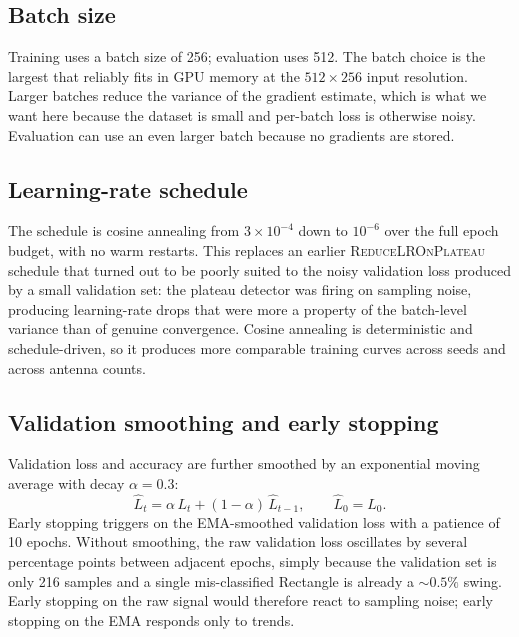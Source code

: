 \documentclass[letterpaper,11pt,leqno]{article}
\begin{document}
\subsection{Batch size}

Training uses a batch size of 256; evaluation uses 512. The batch choice is the largest that reliably fits in GPU memory at the $512\times 256$ input resolution. Larger batches reduce the variance of the gradient estimate, which is what we want here because the dataset is small and per-batch loss is otherwise noisy. Evaluation can use an even larger batch because no gradients are stored.

\subsection{Learning-rate schedule}

The schedule is cosine annealing \citep{Loshchilov17} from $3\times 10^{-4}$ down to $10^{-6}$ over the full epoch budget, with no warm restarts. This replaces an earlier \textsc{ReduceLROnPlateau} schedule that turned out to be poorly suited to the noisy validation loss produced by a small validation set: the plateau detector was firing on sampling noise, producing learning-rate drops that were more a property of the batch-level variance than of genuine convergence. Cosine annealing is deterministic and schedule-driven, so it produces more comparable training curves across seeds and across antenna counts.

\subsection{Validation smoothing and early stopping}

Validation loss and accuracy are further smoothed by an exponential moving average with decay $\alpha=0.3$:
\begin{equation}\label{e:ema}
\widehat{L}_t = \alpha\, L_t + (1-\alpha)\,\widehat{L}_{t-1}, \qquad \widehat{L}_0 = L_0.
\end{equation}
Early stopping triggers on the EMA-smoothed validation loss with a patience of 10 epochs. Without smoothing, the raw validation loss oscillates by several percentage points between adjacent epochs, simply because the validation set is only 216 samples and a single mis-classified Rectangle is already a $\sim 0.5\%$ swing. Early stopping on the raw signal would therefore react to sampling noise; early stopping on the EMA responds only to trends.
\end{document}
